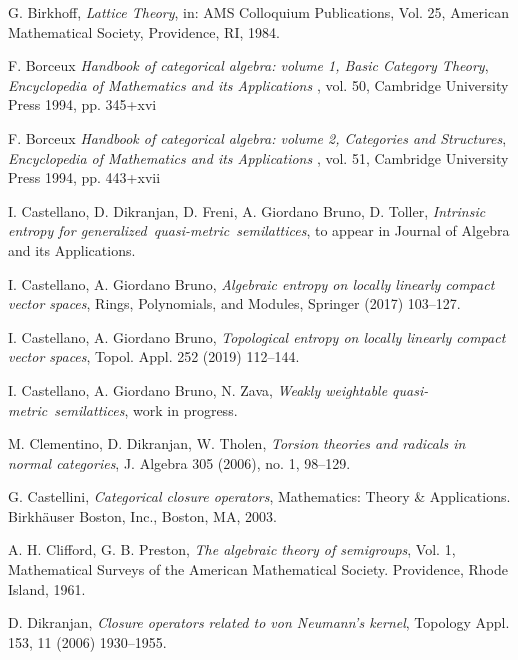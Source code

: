 \documentclass[12pt]{article}
\theoremstyle{definition}
\numberwithin{equation}{section}
\def\gen{generalized\ }
\def\qm{quasi-metric\ }
\begin{document}
\begin{thebibliography}{999}
{ {G. Birkhoff}, {\em Lattice Theory}, in: AMS Colloquium Publications, Vol. 25, American Mathematical Society, Providence, RI, 1984.

 {F. Borceux} {\it Handbook of categorical algebra: volume 1, Basic Category Theory}, {\sl  Encyclopedia of Mathematics and its Applications }, vol. 50, Cambridge University Press 1994, pp. 345+xvi

 {F. Borceux} {\it Handbook of categorical algebra: volume 2, Categories and Structures}, {\sl  Encyclopedia of Mathematics and its Applications }, vol. 51, Cambridge University Press 1994, pp. 443+xvii


 {I. Castellano,  D. Dikranjan, D. Freni, A. Giordano Bruno, D. Toller}, \textit{Intrinsic entropy for \gen \qm semilattices}, to appear in Journal of Algebra and its Applications. 

 {I. Castellano, A. Giordano Bruno}, \textit{Algebraic entropy on locally linearly compact vector spaces}, Rings, Polynomials, and Modules, Springer (2017) 103--127.

 {I. Castellano, A. Giordano Bruno}, \textit{Topological entropy on locally linearly compact vector spaces}, Topol. Appl. 252 (2019) 112--144.

 {I. Castellano, A. Giordano Bruno, N. Zava}, {\em Weakly weightable \qm semilattices}, work in progress.

 M. Clementino, D. Dikranjan, W. Tholen, {\em Torsion theories and radicals in normal categories}, J. Algebra 305 (2006), no. 1, 98--129. 

 G. Castellini, {\em Categorical closure operators}, Mathematics: Theory \& Applications. Birkh\" auser Boston, Inc., Boston, MA, 2003. 

 A. H. Clifford, G. B. Preston, \emph{The algebraic theory of semigroups}, Vol. 1, Mathematical Surveys of the American Mathematical Society. Providence, Rhode Island, 1961.

 {D. Dikranjan}, {\it Closure operators related to von Neumann's kernel}, Topology Appl. 153, 11 (2006) 1930--1955. 

}
\end{thebibliography}
\end{document}
